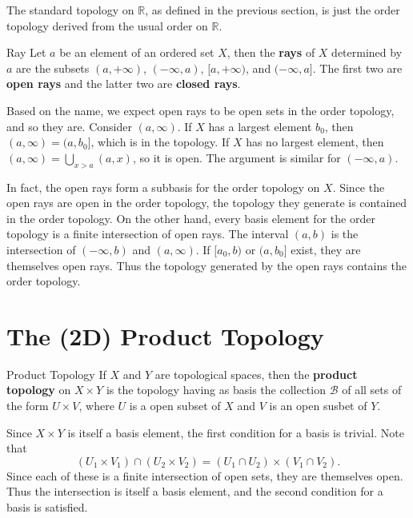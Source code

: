 \documentclass[10pt]{report}
\begin{document}
\begin{ex}{}{}
The standard topology on $\mathbb{R}$, as defined in the previous section, is just the order topology derived from the usual order on $\mathbb{R}$.
\end{ex}

\begin{defn}{Ray}{}
	Let $a$ be an element of an ordered set $X$, then the \textbf{rays} of $X$ determined by $a$ are the subsets $(a,+\infty)$, $(-\infty,a)$, $[a,+\infty)$, and $(-\infty,a]$. The first two are \textbf{open rays} and the latter two are \textbf{closed rays}. 
\end{defn}

Based on the name, we expect open rays to be open sets in the order topology, and so they are. Consider $(a,\infty)$. If $X$ has a largest element $b_0$, then $(a,\infty)=(a,b_0]$, which is in the topology. If $X$ has no largest element, then $(a,\infty) = \bigcup_{x>a}(a,x)$, so it is open. The argument is similar for $(-\infty,a)$.

In fact, the open rays form a subbasis for the order topology on $X$. Since the open rays are open in the order topology, the topology they generate is contained in the order topology. On the other hand, every basis element for the order topology is a finite intersection of open rays. The interval $(a,b)$ is the intersection of $(-\infty,b)$ and $(a,\infty)$. If $[a_0,b)$ or $(a,b_0]$ exist, they are themselves open rays. Thus the topology generated by the open rays contains the order topology.



\section{The (2D) Product Topology}
\begin{defn}{Product Topology}{}
If $X$ and $Y$ are topological spaces, then the \textbf{product topology} on $X \times Y$ is the topology having as basis the collection $\mathcal{B}$ of all sets of the form $U \times V$, where $ U$ is a open subset of $X$ and $V$ is an open susbet of $Y$.
\end{defn}

Since $X \times Y$ is itself a basis element, the first condition for a basis is trivial. Note that \[
	(U_1 \times V_1) \cap (U_2 \times V_2) = (U_1 \cap U_2) \times (V_1 \cap V_2).
\] Since each of these is a finite intersection of open sets, they are themselves open. Thus the intersection is itself a basis element, and the second condition for a basis is satisfied.
\end{document}
